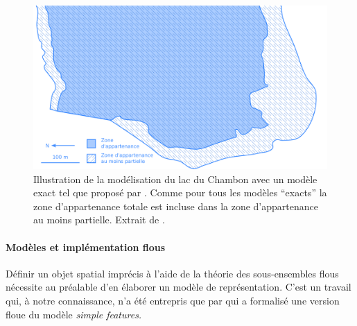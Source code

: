 \begin{figure}
  \centering
  \includegraphics{../figures/fig7.png}
  \caption{Illustration de la modélisation du lac du Chambon avec un
    modèle exact tel que proposé par \textcite{Bejaoui2009}. Comme
    pour tous les modèles “exacts” la zone d’appartenance totale est
    incluse dans la zone d’appartenance au moins partielle. Extrait de
    \textcite{Bunel2020}.}
  \label{fig:champ_exact}
\end{figure}

\paragraph{Modèles et implémentation flous}

Définir un objet spatial imprécis à l’aide de la théorie des
sous-ensembles flous nécessite au préalable d’en élaborer un modèle de
représentation. C’est un travail qui, à notre connaissance, n’a été
entrepris que par \textcite{Schneider1999,Schneider2001} qui a
formalisé une version floue du modèle \emph{simple features.}

